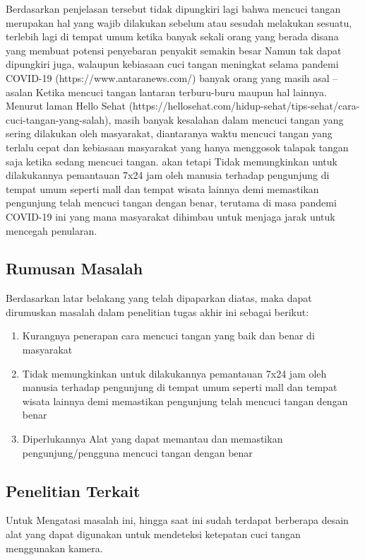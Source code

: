 \documentclass[a4paper]{article}
\begin{document}
			\hspace{6mm}Berdasarkan penjelasan tersebut tidak dipungkiri lagi bahwa mencuci tangan merupakan hal yang wajib dilakukan sebelum atau sesudah melakukan sesuatu, terlebih lagi di tempat umum ketika banyak sekali orang yang berada disana yang membuat potensi penyebaran penyakit semakin besar Namun tak dapat dipungkiri juga, walaupun kebiasaan cuci tangan meningkat selama pandemi COVID-19 (https://www.antaranews.com/) banyak orang yang masih asal – asalan Ketika mencuci tangan lantaran terburu-buru maupun hal lainnya. Menurut laman Hello Sehat (https://hellosehat.com/hidup-sehat/tips-sehat/cara-cuci-tangan-yang-salah), masih banyak kesalahan dalam mencuci tangan yang sering dilakukan oleh masyarakat, diantaranya waktu mencuci tangan yang terlalu cepat dan kebiasaan masyarakat yang hanya menggosok talapak tangan saja ketika sedang mencuci tangan. akan tetapi Tidak memungkinkan untuk dilakukannya pemantauan 7x24 jam oleh manusia terhadap pengunjung di tempat umum seperti mall dan tempat wisata lainnya demi memastikan pengunjung telah mencuci tangan dengan benar, terutama di masa pandemi COVID-19 ini yang mana masyarakat dihimbau untuk menjaga jarak untuk mencegah penularan.

		\subsection{Rumusan Masalah}
		\hspace{11mm}Berdasarkan latar belakang yang telah dipaparkan diatas, maka dapat dirumuskan masalah dalam penelitian tugas akhir ini sebagai berikut:

		\begin{enumerate}
			\item Kurangnya penerapan cara mencuci tangan yang baik dan benar di masyarakat
			\item Tidak memungkinkan untuk dilakukannya pemantauan 7x24 jam oleh manusia terhadap pengunjung di tempat umum seperti mall dan tempat wisata lainnya demi memastikan pengunjung telah mencuci tangan dengan benar
			\item Diperlukannya Alat yang dapat memantau dan memastikan pengunjung/pengguna mencuci tangan dengan benar	
		\end{enumerate}

		\subsection{Penelitian Terkait}
			\hspace{11mm}Untuk Mengatasi masalah ini, hingga saat ini sudah terdapat berberapa desain alat yang dapat digunakan untuk mendeteksi ketepatan cuci tangan menggunakan kamera.
\end{document}
